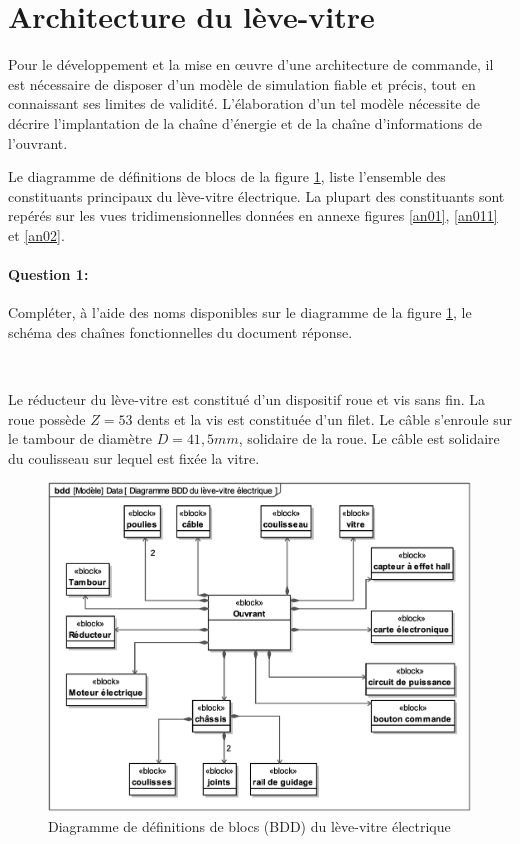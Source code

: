 \section{Architecture du lève-vitre}

Pour le développement et la mise en \oe uvre d'une architecture de commande, il est nécessaire de disposer d'un modèle de simulation fiable et précis, tout en connaissant ses limites de validité. L'élaboration d'un tel modèle nécessite de décrire l'implantation de la chaîne d'énergie et de la chaîne d'informations de l'ouvrant.

Le diagramme de définitions de blocs de la figure \ref{img04}, liste l'ensemble des constituants principaux du lève-vitre électrique. La plupart des constituants sont repérés sur les vues tridimensionnelles données en annexe figures \ref{an01}, \ref{an011} et \ref{an02}.

\paragraph{Question 1:} Compléter, à l'aide des noms disponibles sur le diagramme de la figure \ref{img04}, le schéma des chaînes fonctionnelles du document réponse.

~\

Le réducteur du lève-vitre est constitué d'un dispositif roue et vis sans fin. La roue possède $Z=53$ dents et la vis est constituée d'un filet. Le câble s'enroule sur le tambour de diamètre $D=41,5mm$, solidaire de la roue. Le câble est solidaire du coulisseau sur lequel est fixée la vitre.
 
\begin{figure}[!h]
 \centering\includegraphics[width=0.8\linewidth]{img/img04}
 \caption{Diagramme de définitions de blocs (BDD) du lève-vitre électrique}
 \label{img04}
\end{figure}

